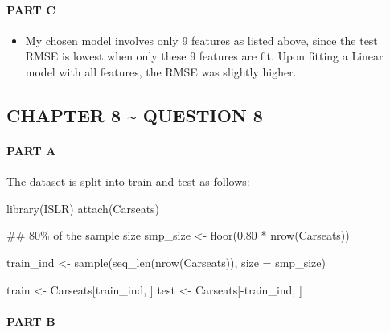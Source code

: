 \documentclass[
]{article}
\newenvironment{Shaded}{}{}
\newcommand{\AttributeTok}[1]{#1}
\newcommand{\DocumentationTok}[1]{\textcolor[rgb]{0.00,0.50,0.00}{#1}}
\newcommand{\FloatTok}[1]{#1}
\newcommand{\FunctionTok}[1]{#1}
\newcommand{\NormalTok}[1]{#1}
\newcommand{\OtherTok}[1]{\textcolor[rgb]{1.00,0.25,0.00}{#1}}
\newcommand{\SpecialCharTok}[1]{\textcolor[rgb]{0.00,0.50,0.50}{#1}}
\providecommand{\tightlist}{%
  \setlength{\itemsep}{0pt}\setlength{\parskip}{0pt}}
\begin{document}
\hypertarget{part-c-3}{%
\paragraph{\texorpdfstring{{PART C}}{PART C}}\label{part-c-3}}

\begin{itemize}
\tightlist
\item
  My chosen model involves only 9 features as listed above, since the
  test RMSE is lowest when only these 9 features are fit. Upon fitting a
  Linear model with all features, the RMSE was slightly higher.
\end{itemize}

\hypertarget{chapter-8-question-8}{%
\subsection{CHAPTER 8 \textasciitilde{} QUESTION
8}\label{chapter-8-question-8}}

\hypertarget{part-a-4}{%
\paragraph{\texorpdfstring{{PART A}}{PART A}}\label{part-a-4}}

The dataset is split into train and test as follows:

\begin{Shaded}
\begin{Highlighting}[]
\FunctionTok{library}\NormalTok{(ISLR)}
\FunctionTok{attach}\NormalTok{(Carseats)}
 
\DocumentationTok{\#\# 80\% of the sample size}
\NormalTok{smp\_size }\OtherTok{\textless{}{-}} \FunctionTok{floor}\NormalTok{(}\FloatTok{0.80} \SpecialCharTok{*} \FunctionTok{nrow}\NormalTok{(Carseats))}
 
\NormalTok{train\_ind }\OtherTok{\textless{}{-}} \FunctionTok{sample}\NormalTok{(}\FunctionTok{seq\_len}\NormalTok{(}\FunctionTok{nrow}\NormalTok{(Carseats)), }\AttributeTok{size =}\NormalTok{ smp\_size)}
 
\NormalTok{train }\OtherTok{\textless{}{-}}\NormalTok{ Carseats[train\_ind, ]}
\NormalTok{test }\OtherTok{\textless{}{-}}\NormalTok{ Carseats[}\SpecialCharTok{{-}}\NormalTok{train\_ind, ]}
\end{Highlighting}
\end{Shaded}

\hypertarget{part-b-4}{%
\paragraph{\texorpdfstring{{PART B}}{PART B}}\label{part-b-4}}
\end{document}
